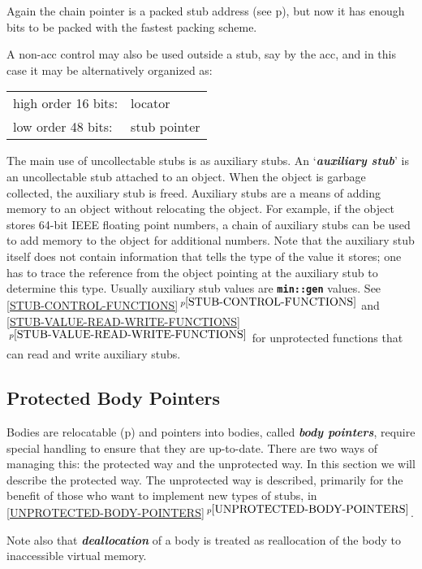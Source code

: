 \documentclass[12pt]{article}
\newcommand{\TT}[1]{{\tt \bfseries #1}}
\newcommand{\key}[1]{{\bf \em #1}\index{#1}}
\newcommand{\skey}[2]{{\bf \em #1#2}\index{#1}}
\newcommand{\ikey}[2]{{\bf \em #1}\index{#2}}
\newcommand{\itemref}[1]{\ref{#1}$\,^{p\pageref{#1}}$}
\newcommand{\pagref}[1]{p\pageref{#1}}
\begin{document}
Again the chain pointer is a packed stub address
(see \pagref{STUB-ADDRESS-PACKING}),
but now it has enough bits to be packed with the fastest packing scheme.

A non-acc control may also be used outside a stub, say by the acc, and
in this case it may be alternatively organized as:

\begin{center}
\begin{tabular}{ll}
high order 16 bits:	& locator \\
low order 48 bits:	& stub pointer \\
\end{tabular}
\end{center}

The main use of uncollectable stubs is as auxiliary stubs.
An `\key{auxiliary stub}' is an uncollectable stub attached to an object.
When the object is garbage collected, the auxiliary stub is freed.  Auxiliary
stubs are a means of adding memory to an object without relocating the object.
For example, if the object stores 64-bit IEEE floating point numbers,
a chain of auxiliary stubs can be used to add memory to the object
for additional numbers.  Note that the auxiliary stub itself does not
contain information that tells the type of the value it stores;
one has to trace the reference from the object pointing at the
auxiliary stub to determine this type.  Usually auxiliary stub
values are \TT{min::gen} values.
See \itemref{STUB-CONTROL-FUNCTIONS} and
\itemref{STUB-VALUE-READ-WRITE-FUNCTIONS}
for unprotected functions that can read and write auxiliary stubs.

\subsection{Protected Body Pointers}
\label{PROTECTED-BODY-POINTERS}

Bodies are relocatable
(\pagref{RELOCATABLE-BODY}) and pointers into bodies,
called \skey{body pointer}s,
require special handling to
ensure that they are up-to-date.  There are two ways of managing
this: the protected way and the unprotected way.
In this section we will describe the protected way.
The unprotected way is described, primarily for the benefit of those
who want to implement new types of stubs,
in \itemref{UNPROTECTED-BODY-POINTERS}.

Note also that \ikey{deallocation}{deallocate} of a body is treated as
reallocation of the body to inaccessible virtual memory.
\end{document}
